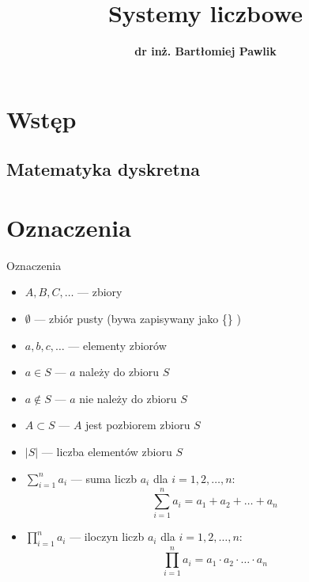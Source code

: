 \documentclass[a4paper,10pt]{beamer}
\title{\bf Systemy liczbowe}
\author[B. Pawlik]{\bf dr inż. Bartłomiej Pawlik}
\begin{document}
\begin{frame}
\titlepage
\end{frame}


\section{Wstęp}

\subsection{Matematyka dyskretna}




\section{Oznaczenia}


\begin{frame}{Oznaczenia}
\begin{itemize}
\item $A,B,C,\ldots$ --- zbiory
\item $\emptyset$ --- zbiór pusty (bywa zapisywany jako \{\} )
\item $a,b,c,\ldots$ --- elementy zbiorów
\item $a\in S$ --- $a$ należy do zbioru $S$
\item $a\not\in S$ --- $a$ nie należy do zbioru $S$
\item $A\subset S$ --- $A$ jest pozbiorem zbioru $S$
\item $|S|$ --- liczba elementów zbioru $S$
\item $\displaystyle\sum\limits_{i=1}^na_i$ --- suma liczb $a_i$ dla $i=1,2,\ldots,n$:
$$\sum\limits_{i=1}^na_i=a_1+a_2+\ldots+a_n$$
\item $\displaystyle\prod\limits_{i=1}^na_i$ --- iloczyn liczb $a_i$ dla $i=1,2,\ldots,n$:
$$\prod\limits_{i=1}^na_i=a_1\cdot a_2\cdot\ldots\cdot a_n$$
\end{itemize}
\end{frame}
\end{document}
